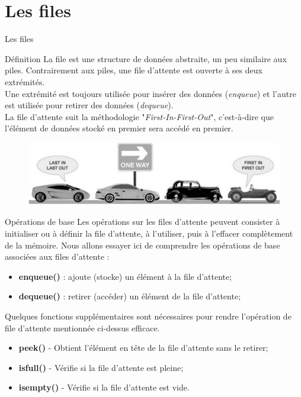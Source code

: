 \documentclass[10pt,xcolor=dvipsnames]{beamer}
\newcommand{\defin}[1]{\textcolor{darkspringgreen}{#1}}
\begin{document}
\section{Les files}

\begin{frame}{Les files}
    \begin{exampleblock}{Définition}
    La \defin{file} est une structure de données abstraite, un peu similaire aux piles. Contrairement aux piles, une file d'attente est ouverte à ses deux extrémités.\\
    
    Une extrémité est toujours utilisée pour insérer des données (\textit{enqueue}) et l'autre est utilisée pour retirer des données (\textit{dequeue}).\\
    
    La file d'attente suit la méthodologie "\textit{First-In-First-Out}", c'est-à-dire que l'élément de données stocké en premier sera accédé en premier.
    \end{exampleblock}
    
    \begin{figure}
        \centering
        \includegraphics[scale=0.2]{figures/CM2/file-voiture.png}
        \label{fig:my_label}
    \end{figure}
\end{frame}

\begin{frame}{Opérations de base}
    Les opérations sur les files d'attente peuvent consister à initialiser ou à définir la file d'attente, à l'utiliser, puis à l'effacer complètement de la mémoire. Nous allons essayer ici de comprendre les opérations de base associées aux files d'attente :
    
    \begin{itemize}
        \item \alert{\textbf{enqueue()}} : ajoute (stocke) un élément à la file d'attente;
        \item \alert{\textbf{dequeue()}} : retirer (accéder) un élément de la file d'attente;
    \end{itemize}
Quelques fonctions supplémentaires sont nécessaires pour rendre l'opération de file d'attente mentionnée ci-dessus efficace.

\begin{itemize}
    \item \alert{\textbf{peek()}} - Obtient l'élément en tête de la file d'attente sans le retirer;
    \item \alert{\textbf{isfull()}} - Vérifie si la file d'attente est pleine;
    \item \alert{\textbf{isempty()}} - Vérifie si la file d'attente est vide.
\end{itemize}
\end{frame}
\end{document}
